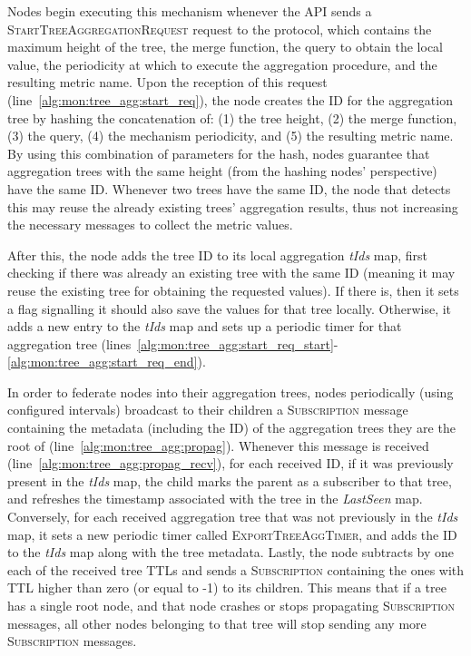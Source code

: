 

Nodes begin executing this mechanism whenever the API sends a \textsc{StartTreeAggregationRequest} request to the protocol, which contains the maximum height of the tree, the merge function, the query to obtain the local value, the periodicity at which to execute the aggregation procedure, and the resulting metric name. Upon the reception of this request (line~\ref{alg:mon:tree_agg:start_req}), the node creates the ID for the aggregation tree by hashing the concatenation of: (1) the tree height, (2) the merge function, (3) the query, (4) the mechanism periodicity, and (5) the resulting metric name. By using this combination of parameters for the hash, nodes guarantee that aggregation trees with the same height (from the hashing nodes' perspective) have the same ID. Whenever two trees have the same ID, the node that detects this may reuse the already existing trees' aggregation results, thus not increasing the necessary messages to collect the metric values.
 
 After this, the node adds the tree ID to its local aggregation \textit{tIds} map, first checking if there was already an existing tree with the same ID (meaning it may reuse the existing tree for obtaining the requested values). If there is, then it sets a flag signalling it should also save the values for that tree locally. Otherwise, it adds a new entry to the \textit{tIds} map and sets up a periodic timer for that aggregation tree (lines~\ref{alg:mon:tree_agg:start_req_start}-\ref{alg:mon:tree_agg:start_req_end}).

In order to federate nodes into their aggregation trees, nodes periodically (using configured intervals) broadcast to their children a \textsc{Subscription} message containing the metadata (including the ID) of the aggregation trees they are the root of (line~\ref{alg:mon:tree_agg:propag}). Whenever this message is received (line~\ref{alg:mon:tree_agg:propag_recv}), for each received ID, if it was previously present in the \textit{tIds} map, the child marks the parent as a subscriber to that tree, and refreshes the timestamp associated with the tree in the \textit{LastSeen} map. Conversely, for each received aggregation tree that was not previously in the \textit{tIds} map, it sets a new periodic timer called \textsc{ExportTreeAggTimer}, and adds the ID to the \textit{tIds} map along with the tree metadata. Lastly, the node subtracts by one each of the received tree TTLs and sends a \textsc{Subscription} containing the ones with TTL higher than zero (or equal to -1) to its children. This means that if a tree has a single root node, and that node crashes or stops propagating \textsc{Subscription} messages, all other nodes belonging to that tree will stop sending any more \textsc{Subscription} messages.

